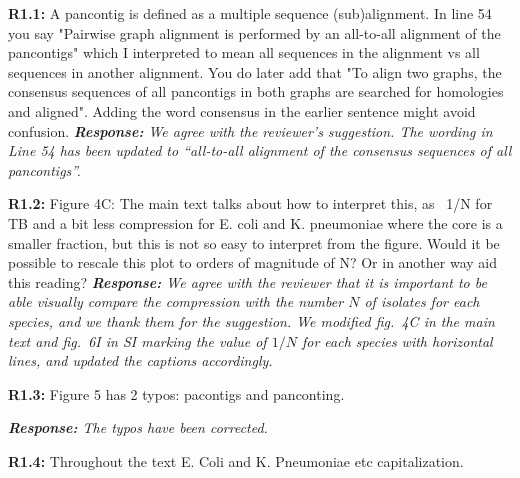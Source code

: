 \documentclass[aps,rmp,onecolumn]{revtex4-1}
\newcommand{\Marco}[1]{{\color{orange}Marco: #1}}
\newcommand{\Liam}[1]{{\color{teal}Liam: #1}}
\newcommand{\reviewer}[2]{\textbf{#1:} #2\vskip 5mm}
\newcommand{\response}[1]{{\it {\color{response}\textbf{Response:} #1}}\vskip 5mm}
\newcommand{\SIfigBenchmark}{6}
\begin{document}
\reviewer{R1.1}{A pancontig is defined as a multiple sequence (sub)alignment. In line 54 you say "Pairwise graph alignment is performed by an all-to-all alignment of the pancontigs" which I interpreted to mean all sequences in the alignment vs all sequences in another alignment. You do later add that "To align two graphs, the consensus sequences of all pancontigs in both graphs are searched for homologies and aligned". Adding the word consensus in the earlier sentence might avoid confusion.}
\response{We agree with the reviewer's suggestion. The wording in Line 54 has been updated to ``all-to-all alignment of the consensus sequences of all \textit{pancontigs}''.}

\reviewer{R1.2}{Figure 4C: The main text talks about how to interpret this, as ~1/N for TB and a bit less compression for E. coli and K. pneumoniae where the core is a smaller fraction, but this is not so easy to interpret from the figure. Would it be possible to rescale this plot to orders of magnitude of N? Or in another way aid this reading?}
\response{We agree with the reviewer that it is important to be able visually compare the compression with the number $N$ of isolates for each species, and we thank them for the suggestion. We modified fig.~4C in the main text and fig.~{\SIfigBenchmark}I in SI marking the value of $1/N$ for each species with horizontal lines, and updated the captions accordingly.}

\reviewer{R1.3}{Figure 5 has 2 typos: pacontigs and panconting.}

\response{The typos have been corrected.}

\reviewer{R1.4}{Throughout the text E. Coli and K. Pneumoniae etc capitalization.}
\end{document}
